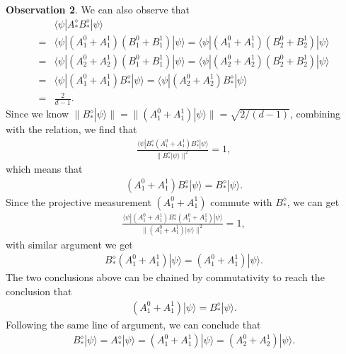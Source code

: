 \documentclass[11pt,letterpaper]{article}
\newcommand{\ket}[1]{|#1\rangle}
\newcommand{\bra}[1]{\langle#1|}
\DeclareMathOperator{\supp}{supp}
\newcommand{\1}{\mathbb{1}}
\theoremstyle{definition}
\begin{document}
\textbf{Observation 2}. We can also observe that
\begin{align}
	&\bra{\psi}A_\ast^\diamond B_\ast^\diamond\ket{\psi}\\
	=&\bra{\psi} (A_1^0+A_1^1)(B_1^0+B_1^1) \ket{\psi} =\bra{\psi} (A_1^0+A_1^1)(B_2^0+B_2^1) \ket{\psi}\\
	=&\bra{\psi} (A_2^0+A_2^1)(B_1^0+B_1^1) \ket{\psi} =\bra{\psi} (A_2^0+A_2^1)(B_2^0+B_2^1) \ket{\psi}\\
	=& \bra{\psi} (A_1^0+A_1^1)B_\ast^\diamond \ket{\psi} = \bra{\psi} (A_2^0+A_2^1)B_\ast^\diamond \ket{\psi}\\
	= &\frac{2}{d-1}.
\end{align}
Since we know $\| B_\ast^\diamond \ket{\psi} \| = \| (A_1^0+A_1^1) \ket{\psi}\| = \sqrt{2/(d-1)}$,
combining with the relation, we find that 
\begin{align}
	\frac{\bra{\psi}B_\ast^\diamond (A_1^0+A_1^1) B_\ast^\diamond\ket{\psi}}{ \| B_\ast^\diamond \ket{\psi} \|^2} = 1,
\end{align}
which means that 
\begin{align}
	(A_1^0+A_1^1)B_\ast^\diamond \ket{\psi} = B_\ast^\diamond \ket{\psi}.
\end{align}
Since the projective measurement $(A_1^0+A_1^1)$ commute with $B_\ast^\diamond$, we can get
\begin{align}
	\frac{\bra{\psi} (A_1^0+A_1^1) B_\ast^\diamond(A_1^0+A_1^1)\ket{\psi}}{ \| (A_1^0+A_1^1) \ket{\psi} \|^2} = 1,
\end{align}
with similar argument we get 
\begin{align}
	B_\ast^\diamond (A_1^0+A_1^1) \ket{\psi} = (A_1^0+A_1^1)\ket{\psi}.
\end{align}
The two conclusions above can be chained by commutativity to reach the conclusion that 
\begin{align}
	(A_1^0+A_1^1)\ket{\psi} = B_\ast^\diamond \ket{\psi}.
\end{align}
Following the same line of argument, we can conclude that
\begin{align}
	B_\ast^\diamond \ket{\psi} = A_\ast^\diamond \ket{\psi} = (A_1^0+A_1^1)\ket{\psi} = (A_2^0+A_2^1)\ket{\psi}.
\end{align}

\end{document}
